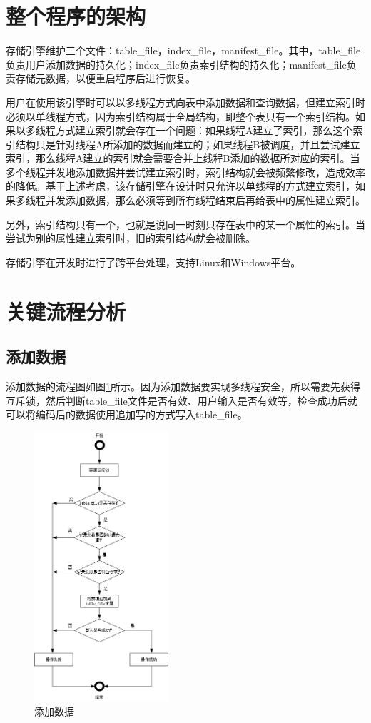 \documentclass[bachelor]{thesis-uestc}
\begin{document}
\section{整个程序的架构}
存储引擎维护三个文件：table\_file，index\_file，manifest\_file。其中，table\_file负责用户添加数据的持久化；index\_file负责索引结构的持久化；manifest\_file负责存储元数据，以便重启程序后进行恢复。\par
用户在使用该引擎时可以以多线程方式向表中添加数据和查询数据，但建立索引时必须以单线程方式，因为索引结构属于全局结构，即整个表只有一个索引结构。如果以多线程方式建立索引就会存在一个问题：如果线程A建立了索引，那么这个索引结构只是针对线程A所添加的数据而建立的；如果线程B被调度，并且尝试建立索引，那么线程A建立的索引就会需要合并上线程B添加的数据所对应的索引。当多个线程并发地添加数据并尝试建立索引时，索引结构就会被频繁修改，造成效率的降低。基于上述考虑，该存储引擎在设计时只允许以单线程的方式建立索引，如果多线程并发添加数据，那么必须等到所有线程结束后再给表中的属性建立索引。\par
另外，索引结构只有一个，也就是说同一时刻只存在表中的某一个属性的索引。当尝试为别的属性建立索引时，旧的索引结构就会被删除。\par
存储引擎在开发时进行了跨平台处理，支持Linux和Windows平台。

\section{关键流程分析}
\subsection{添加数据}
添加数据的流程图如图\ref{fig:append}所示。因为添加数据要实现多线程安全，所以需要先获得互斥锁，然后判断table\_file文件是否有效、用户输入是否有效等，检查成功后就可以将编码后的数据使用追加写的方式写入table\_file。

\begin{figure}[htbp]
	\centering\includegraphics[height=10cm]{images/append.png}
	\caption{添加数据}
	\label{fig:append}
\end{figure}
\end{document}
